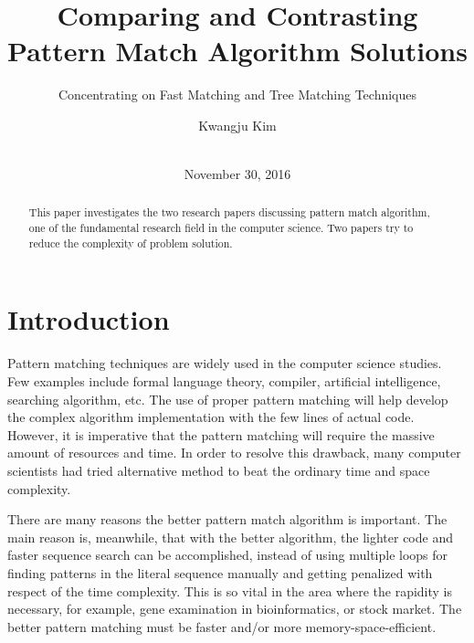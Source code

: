\documentclass{acm_proc_article-sp}
\begin{document}
\title{Comparing and Contrasting {\ttlit Pattern Match} Algorithm Solutions}
\subtitle{Concentrating on Fast Matching and Tree Matching Techniques}

\author{
\alignauthor
Kwangju Kim\\
       \\
}

\date{November 30, 2016}


\maketitle
\begin{abstract}
This paper investigates the two research papers discussing pattern match algorithm, one of the fundamental research field in the computer science. Two papers try to reduce the complexity of problem solution.
\end{abstract}




\section{Introduction}
\begin{flushleft}
Pattern matching techniques are widely used in the computer science studies. Few examples include formal language theory, compiler, artificial intelligence, searching algorithm, etc. The use of proper pattern matching will help develop the complex algorithm implementation with the few lines of actual code. However, it is imperative that the pattern matching will require the massive amount of resources and time. In order to resolve this drawback, many computer scientists had tried alternative method to beat the ordinary time and space complexity. 

There are many reasons the better pattern match algorithm is important. The main reason is, meanwhile, that with the better algorithm, the lighter code and faster sequence search can be accomplished, instead of using multiple loops for finding patterns in the literal sequence manually and getting penalized with respect of the time complexity. This is so vital in the area where the rapidity is necessary, for example, gene examination in bioinformatics, or stock market. The better pattern matching must be faster and/or more memory-space-efficient.
\end{flushleft}
\end{document}

